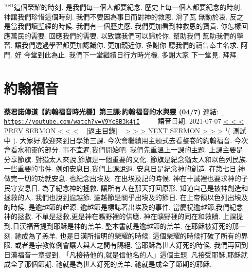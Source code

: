 \documentclass{book}
\begin{document}
$^{1081}$這個榮耀的時刻.
是我們每一個人都要紀念.
歷史上每一個人都要紀念的時刻.
神讓我們珍惜這個時刻.
我們不要因為事日而對神的救恩.
滑了瓦 無動於衷.
反之是當我們讀聖經的時候.
我們有一個歷史感.
我們更加看到神救恩的寶貴.
你怎樣回應萬民的需要.
回應我們的需要.
以致讓我們可以歸於你.
幫助我們 幫助我們的學習.
讓我們透過學習都更加認識你.
更加親近你.
多謝你 聽我們的禱告奉主名求.
阿門.
好 今堂到此為止.
我們下一堂繼續日行方時光機.
多謝大家 下一堂見.
拜拜.
\newpage



\section{約翰福音}
\label{sec:V9Yc8B3k4jI}
\textbf{蔡君諾傳道【約翰福音時光機】第三課:約翰福音的水與靈 (04/7)}
\newline
\newline
連結: \href{https://youtube.com/watch?v=V9Yc8B3k4jI}{\texttt{ https://youtube.com/watch?v=V9Yc8B3k4jI}} ~~~~ 語音日期: 2021-07-07 
\newline
\newline
\hyperref[sec:SEh8cg_SNkc]{\small{< < < PREV SERMON < < <}}
~
\hyperref[sec:index]{\small{[返主目錄]}}
~
\hyperref[sec:dO8lwORzvRQ]{\small{> > > NEXT SERMON > > >}}
\newline
\newline
$^{1}$( 測試中 ).
大家好,歡迎來到日學第三課.
今次會繼續用主題式去看整卷的約翰福音.
今次會看水和靈的部分.
事不宜遲,我們開始吧.
我們先重溫上一課的主題.
上課主要是分享節旗.
對猶太人來說,節旗是一個重要的文化.
節旗是紀念猶太人和以色列民族.
一些重要的事件.
例如安息日,我們上課說過.
安息日是紀念神的創造.
在第七日,神做完一切的功就安息.
也紀念出埃及.
在出埃及記的時候.
神在十誡裡也要求神的子民守安息日.
為了紀念神的拯救.
讓所有人在那天打回原形.
知道自己是被神創造和拯救的人.
我們也說到逾越節.
逾越節是關乎出埃及的節日.
在上帝領以色列出埃及的時候.
是逾越節的起源.
逾越節是標誌著出埃及的事件.
當慶祝逾越節,我們紀念神的拯救.
不單是拯救,更是神在曠野裡的供應.
神在曠野裡的同在和救贖.
上課提到,日漢福音提到耶穌是神的羔羊.
整本書就是逾越節的羔羊.
在耶穌被釘死的那一刻.
祂成為了羔羊.
也是日漢所指明的榮耀的時候.
這個榮耀的時候打破了所有的界限.
或者是宗教條例會讓人與人之間有隔絕.
當耶穌為世人釘死的時候.
我們再回到日漢福音一章提到.
「凡接待他的,就是信他名的人」這個主題.
凡接受耶穌,耶穌就成全了那個節期.
祂就是為世人釘死的羔羊.
祂就是成全了節期的耶穌.
\end{document}
